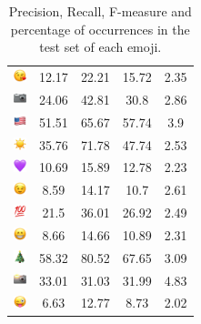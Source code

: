 \documentclass{article}
\begin{document}
\begin{table}
\begin{tabular}{|c|ccc|c|}
\includegraphics[height=0.37cm,width=0.37cm]{img/face_blowing_a_kiss.png} & 12.17 & 22.21 & 15.72 & 2.35\\ 
\includegraphics[height=0.37cm,width=0.37cm]{img/camera.png} & 24.06 & 42.81 & 30.8 & 2.86\\ 
\includegraphics[height=0.37cm,width=0.37cm]{img/United_States.png} & 51.51 & 65.67 & 57.74 & 3.9\\ 
\includegraphics[height=0.37cm,width=0.37cm]{img/sun.png} & 35.76 & 71.78 & 47.74 & 2.53\\ 
\includegraphics[height=0.37cm,width=0.37cm]{img/purple_heart.png} & 10.69 & 15.89 & 12.78 & 2.23\\ 
\includegraphics[height=0.37cm,width=0.37cm]{img/winking_face.png} & 8.59 & 14.17 & 10.7 & 2.61\\ 
\includegraphics[height=0.37cm,width=0.37cm]{img/hundred_points.png} & 21.5 & 36.01 & 26.92 & 2.49\\ 
\includegraphics[height=0.37cm,width=0.37cm]{img/beaming_face_with_smiling_eyes.png} & 8.66 & 14.66 & 10.89 & 2.31\\ 
\includegraphics[height=0.37cm,width=0.37cm]{img/Christmas_tree.png} & 58.32 & 80.52 & 67.65 & 3.09\\ 
\includegraphics[height=0.37cm,width=0.37cm]{img/camera_with_flash.png} & 33.01 & 31.03 & 31.99 & 4.83\\ 
\includegraphics[height=0.37cm,width=0.37cm]{img/winking_face_with_tongue.png} & 6.63 & 12.77 & 8.73 & 2.02\\ 

\hline
\end{tabular}
\caption{\label{table:emoji_detailed} Precision, Recall, F-measure and percentage of occurrences in the test set of each emoji.}
\end{table}
\end{document}
